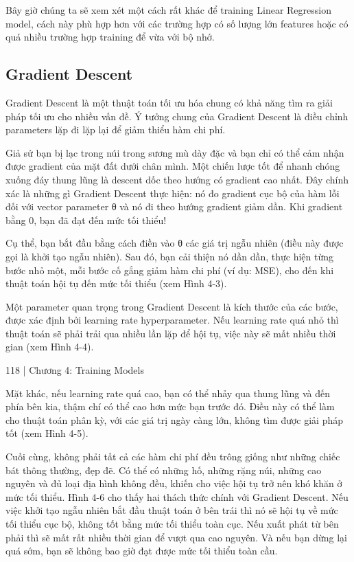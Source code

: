 Bây giờ chúng ta sẽ xem xét một cách rất khác để training Linear Regression model, cách này phù hợp hơn với các trường hợp có số lượng lớn features hoặc có quá nhiều trường hợp training để vừa với bộ nhớ.

\subsection{Gradient Descent}

Gradient Descent là một thuật toán tối ưu hóa chung có khả năng tìm ra giải pháp tối ưu cho nhiều vấn đề. Ý tưởng chung của Gradient Descent là điều chỉnh parameters lặp đi lặp lại để giảm thiểu hàm chi phí.

Giả sử bạn bị lạc trong núi trong sương mù dày đặc và bạn chỉ có thể cảm nhận được gradient của mặt đất dưới chân mình. Một chiến lược tốt để nhanh chóng xuống đáy thung lũng là descent dốc theo hướng có gradient cao nhất. Đây chính xác là những gì Gradient Descent thực hiện: nó đo gradient cục bộ của hàm lỗi đối với vector parameter θ và nó đi theo hướng gradient giảm dần. Khi gradient bằng 0, bạn đã đạt đến mức tối thiểu!

Cụ thể, bạn bắt đầu bằng cách điền vào θ các giá trị ngẫu nhiên (điều này được gọi là khởi tạo ngẫu nhiên). Sau đó, bạn cải thiện nó dần dần, thực hiện từng bước nhỏ một, mỗi bước cố gắng giảm hàm chi phí (ví dụ: MSE), cho đến khi thuật toán hội tụ đến mức tối thiểu (xem Hình 4-3).

Một parameter quan trọng trong Gradient Descent là kích thước của các bước, được xác định bởi learning rate hyperparameter. Nếu learning rate quá nhỏ thì thuật toán sẽ phải trải qua nhiều lần lặp để hội tụ, việc này sẽ mất nhiều thời gian (xem Hình 4-4).

118 | Chương 4: Training Models

Mặt khác, nếu learning rate quá cao, bạn có thể nhảy qua thung lũng và đến phía bên kia, thậm chí có thể cao hơn mức bạn trước đó. Điều này có thể làm cho thuật toán phân kỳ, với các giá trị ngày càng lớn, không tìm được giải pháp tốt (xem Hình 4-5).

Cuối cùng, không phải tất cả các hàm chi phí đều trông giống như những chiếc bát thông thường, đẹp đẽ. Có thể có những hố, những rặng núi, những cao nguyên và đủ loại địa hình không đều, khiến cho việc hội tụ trở nên khó khăn ở mức tối thiểu. Hình 4-6 cho thấy hai thách thức chính với Gradient Descent. Nếu việc khởi tạo ngẫu nhiên bắt đầu thuật toán ở bên trái thì nó sẽ hội tụ về mức tối thiểu cục bộ, không tốt bằng mức tối thiểu toàn cục. Nếu xuất phát từ bên phải thì sẽ mất rất nhiều thời gian để vượt qua cao nguyên. Và nếu bạn dừng lại quá sớm, bạn sẽ không bao giờ đạt được mức tối thiểu toàn cầu.

